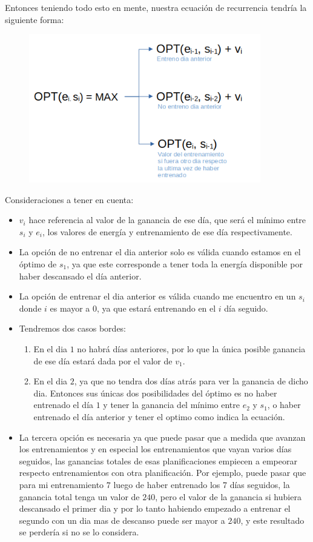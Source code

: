 Entonces teniendo todo esto en mente, nuestra ecuación de recurrencia tendría la siguiente forma:

\begin{figure}[H]
    \centering
    \includegraphics[width=0.9\textwidth]{img/equation.png}
\end{figure}

Consideraciones a tener en cuenta:

\begin{itemize}
	\item $v_i$ hace referencia al valor de la ganancia de ese día, que será el mínimo entre $s_i$ y $e_i$, los valores de energía y entrenamiento de ese día respectivamente.
	\item La opción de no entrenar el dia anterior solo es válida cuando estamos en el óptimo de $s_1$, ya que este corresponde a tener toda la energía disponible por haber descansado el día anterior.
	\item La opción de entrenar el dia anterior es válida cuando me encuentro en un $s_i$ donde $i$ es mayor a 0, ya que estará entrenando en el $i$ día seguido.
	\item Tendremos dos casos bordes:
	\begin{enumerate}
    	\item En el dia $1$ no habrá días anteriores, por lo que la única posible ganancia de ese día estará dada por el valor de $v_1$.
    	\item En el dia $2$, ya que no tendra dos días atrás para ver la ganancia de dicho dia. Entonces sus únicas dos posibilidades del óptimo es no haber entrenado el día $1$ y tener la ganancia del mínimo entre $e_2$ y $s_1$, o haber entrenado el día anterior y tener el optimo como indica la ecuación.
	\end{enumerate}
    \item La tercera opción es necesaria ya que puede pasar que a medida que avanzan los entrenamientos y en especial los entrenamientos que vayan varios días seguidos, las ganancias totales de esas planificaciones empiecen a empeorar respecto entrenamientos con otra planificación. Por ejemplo, puede pasar que para mi entrenamiento $7$ luego de haber entrenado los 7 días seguidos, la ganancia total tenga un valor de $240$, pero el valor de la ganancia si hubiera descansado el primer dia y por lo tanto habiendo empezado a entrenar el segundo con un dia mas de descanso puede ser mayor a $240$, y este resultado se perdería si no se lo considera.
\end{itemize}
